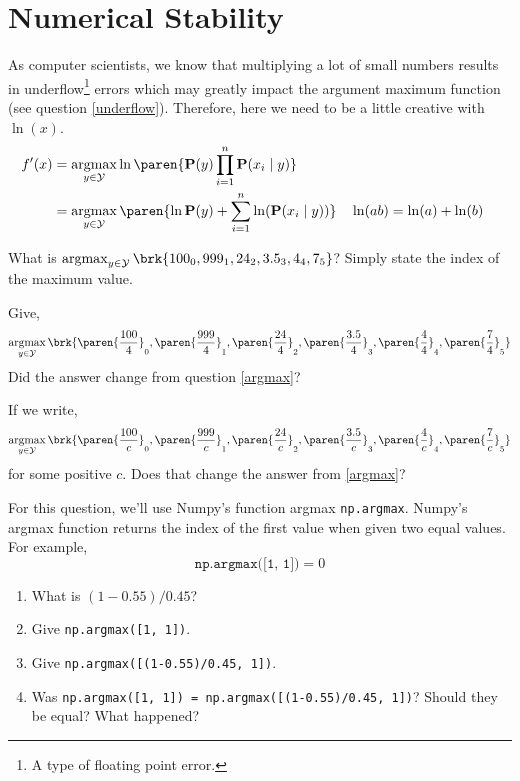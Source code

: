 \documentclass{homework}
\renewcommand\P{\mathbf{P}}
\newcommand\Y{\mathcal{Y}}
\DeclareMathOperator*{\argmax}{argmax}
\begin{document}
\section{Numerical Stability}
As computer scientists, we know that multiplying a lot of small
numbers results in underflow\footnote{A type of floating point error.}
errors which may greatly impact the argument maximum function (see
question \ref{underflow}). Therefore, here we need to be a little
creative with $\ln(x)$.
\begin{align*}
  f'(x)
   & = \argmax_{y\in \Y}
  \ln\paren{\P(y)\prod_{i=1}^n\P(x_i \mid y)} \\
   & = \argmax_{y\in \Y}
  \paren{\ln \P(y) + \sum_{i=1}^n\ln(\P(x_i \mid y))}
   &
   & \ln(ab) = \ln(a) + \ln(b)                \\
\end{align*}

\question\label{argmax} What is
$\argmax_{y\in \Y} \brk{100_0, 999_1, 24_2, 3.5_3, 4_4, 7_5}$? Simply
state the index of the maximum value.


\question\label{argmax1} Give,
\[
  \argmax_{y\in \Y} \brk{
    \paren{\frac{100}{4}}_0,
    \paren{\frac{999}{4}}_1,
    \paren{\frac{24}{4}}_2,
    \paren{\frac{3.5}{4}}_3,
    \paren{\frac{4}{4}}_4,
    \paren{\frac{7}{4}}_5
  }
\]
Did the answer change from question \ref{argmax}?


\question\label{argmax2} If we write,
\[
  \argmax_{y\in \Y}
  \brk{\paren{\frac{100}{c}}_0,
    \paren{\frac{999}{c}}_1,
    \paren{\frac{24}{c}}_2,
    \paren{\frac{3.5}{c}}_3,
    \paren{\frac{4}{c}}_4,
    \paren{\frac{7}{c}}_5
  }
\]
for some positive $c$. Does that change the answer from \ref{argmax}?


\question\label{underflow} For this question, we'll use Numpy's
function argmax \eg \texttt{np.argmax}. Numpy's argmax function
returns the index of the first value when given two equal values. For
example,
\[
  \texttt{np.argmax([1, 1])} = 0
\]
\begin{enumerate}
  \item What is $(1-0.55)/0.45$?
  \item Give \texttt{np.argmax([1, 1])}.
  \item Give \texttt{np.argmax([(1-0.55)/0.45, 1])}.
  \item Was \texttt{np.argmax([1, 1]) = np.argmax([(1-0.55)/0.45, 1])}?
        Should they be equal? What happened?
\end{enumerate}
\end{document}
